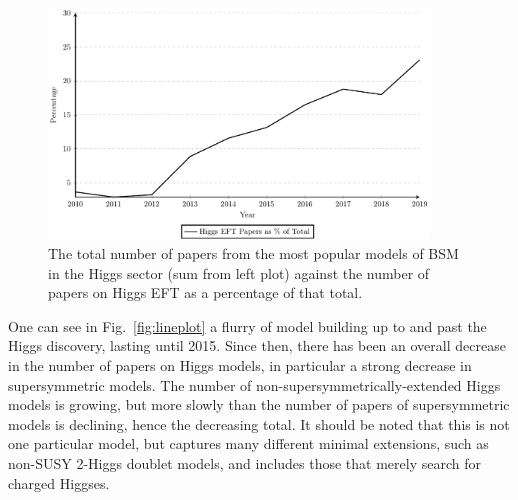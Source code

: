 \begin{figure}
\includegraphics[width=0.9\textwidth]{percenttotal_eft_2107}
\caption{The total number of papers from the most popular models of BSM in the Higgs sector (sum from left plot) against the number of papers on Higgs EFT as a percentage of that total.}
\label{fig:percent}
\end{figure}


One can see in Fig.~\ref{fig:lineplot} a flurry of model building up to and past the Higgs discovery, lasting until 2015. 
Since then, there has been an overall decrease in the number of papers on Higgs models, in particular a strong decrease in supersymmetric models. 
The number of non-supersymmetrically-extended Higgs models is growing, but more slowly than the number of papers of supersymmetric models is declining, hence the decreasing total. 
It should be noted that this is not one particular model, but captures many different minimal extensions, such as non-SUSY 2-Higgs doublet models, and includes those that merely search for charged Higgses.

